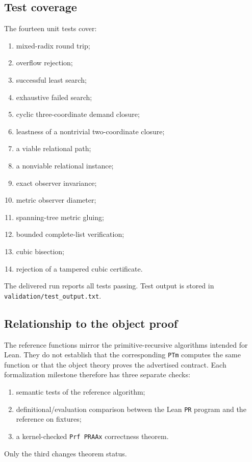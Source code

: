 \subsection{Test coverage}

The fourteen unit tests cover:
\begin{enumerate}[label=(\arabic*),leftmargin=2.3em]
\item mixed-radix round trip;
\item overflow rejection;
\item successful least search;
\item exhaustive failed search;
\item cyclic three-coordinate demand closure;
\item leastness of a nontrivial two-coordinate closure;
\item a viable relational path;
\item a nonviable relational instance;
\item exact observer invariance;
\item metric observer diameter;
\item spanning-tree metric gluing;
\item bounded complete-list verification;
\item cubic bisection;
\item rejection of a tampered cubic certificate.
\end{enumerate}
The delivered run reports all tests passing.  Test output is stored in \texttt{validation/test\_output.txt}.

\subsection{Relationship to the object proof}

The reference functions mirror the primitive-recursive algorithms intended for Lean.  They do not establish that the corresponding \texttt{PTm} computes the same function or that the object theory proves the advertised contract.  Each formalization milestone therefore has three separate checks:
\begin{enumerate}[label=(\roman*),leftmargin=2.3em]
\item semantic tests of the reference algorithm;
\item definitional/evaluation comparison between the Lean \texttt{PR} program and the reference on fixtures;
\item a kernel-checked \texttt{Prf PRAAx} correctness theorem.
\end{enumerate}
Only the third changes theorem status.

